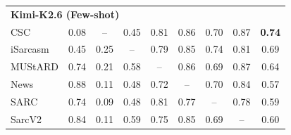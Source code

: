 \documentclass[sigconf, nonacm]{acmart}
\begin{document}
\begin{table}[htbp]
{\begin{tabular}{l|c|ccccccc}
\midrule
\multicolumn{9}{l}{\textbf{Kimi-K2.6 (Few-shot)}} \\
CSC       & 0.08 & -- & 0.45 & 0.81 & 0.86 & 0.70 & 0.87 & \textbf{0.74} \\
iSarcasm  & 0.45 & 0.25 & -- & 0.79 & 0.85 & 0.74 & 0.81 & 0.69 \\
MUStARD   & 0.74 & 0.21 & 0.58 & -- & 0.86 & 0.69 & 0.87 & 0.64 \\
News      & 0.88 & 0.11 & 0.48 & 0.72 & -- & 0.70 & 0.84 & 0.57 \\
SARC      & 0.74 & 0.09 & 0.48 & 0.81 & 0.77 & -- & 0.78 & 0.59 \\
SarcV2    & 0.84 & 0.11 & 0.59 & 0.75 & 0.85 & 0.69 & -- & 0.60 \\

\bottomrule
\end{tabular}
}
\end{table}





\FloatBarrier 


\end{document}
